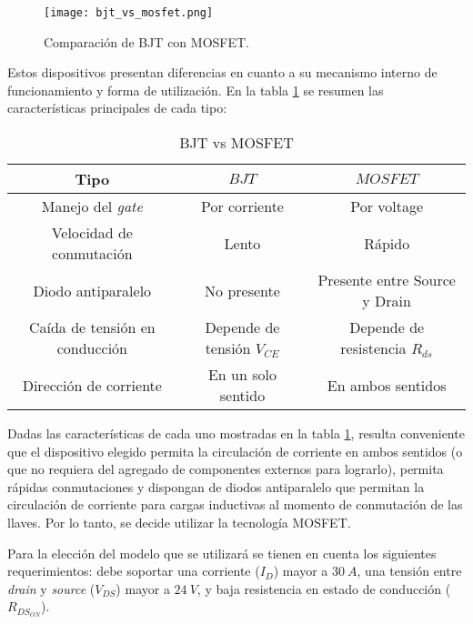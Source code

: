 \begin{figure}[H]
	\centering
	\texttt{[image: bjt\_vs\_mosfet.png]}
	\caption{Comparación de BJT con MOSFET.}
	\label{fig:img_bjt_vs_mosfet}
\end{figure}

Estos dispositivos presentan diferencias en cuanto a su mecanismo interno de funcionamiento y forma de utilización. En la tabla \ref{tab_MOSFETvsBJT} se resumen las características principales de cada tipo:

\begin{table}[H]
	\begin{center}
		\begin{tabular}{| c | c | c |}
			\hline
			Tipo & $BJT$ & $MOSFET$\\ \hline
			Manejo del \textsl{gate} & Por corriente & Por voltage \\ \hline 
			Velocidad de conmutación & Lento & Rápido \\ \hline 
			Diodo antiparalelo & No presente & Presente entre Source y Drain \\ \hline 
			Caída de tensión en conducción & Depende de tensión  $V_{CE}$ & Depende de resistencia $R_{ds}$ \\ \hline 
			Dirección de corriente & En un solo sentido & En ambos sentidos \\ \hline 
		\end{tabular}
		\caption{BJT vs MOSFET}
		\label{tab_MOSFETvsBJT}
	\end{center}
\end{table}

Dadas las características de cada uno mostradas en la tabla \ref{tab_MOSFETvsBJT}, resulta conveniente que el dispositivo elegido permita la circulación de corriente en ambos sentidos (o que no requiera del agregado de componentes externos para lograrlo), permita rápidas conmutaciones y dispongan de diodos antiparalelo que permitan la circulación de corriente para cargas inductivas al momento de conmutación de las llaves. Por lo tanto, se decide utilizar la tecnología MOSFET.

Para la elección del modelo que se utilizará se tienen en cuenta los siguientes requerimientos: debe soportar una corriente ($I_{D}$) mayor a $30\:A$, una tensión entre \textsl{drain} y \textsl{source} ($V_{DS}$) mayor a $24\:V$, y baja resistencia en estado de conducción ($R_{DS_{ON}}$).

